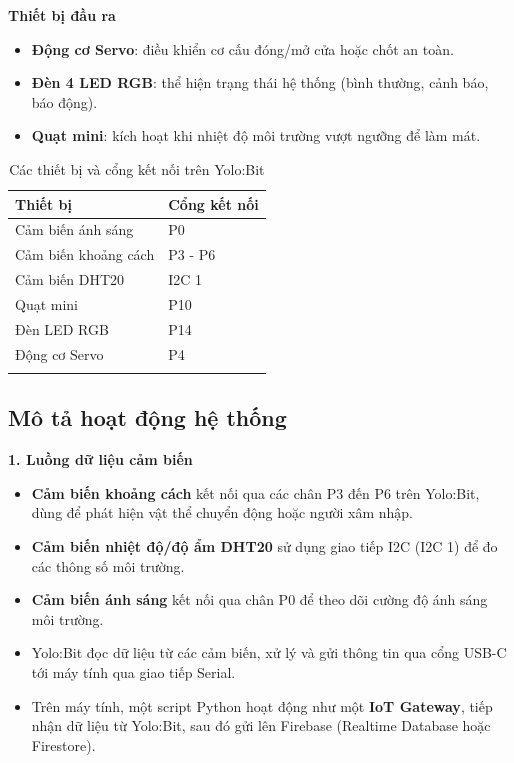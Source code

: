 \textbf{Thiết bị đầu ra}
\begin{itemize}
    \item \textbf{Động cơ Servo}: điều khiển cơ cấu đóng/mở cửa hoặc chốt an toàn.
    \item \textbf{Đèn 4 LED RGB}: thể hiện trạng thái hệ thống (bình thường, cảnh báo, báo động).
    \item \textbf{Quạt mini}: kích hoạt khi nhiệt độ môi trường vượt ngưỡng để làm mát.
\end{itemize}

\begin{longtable}{|p{5cm}|p{4cm}|}
    \hline
    \textbf{Thiết bị}    & \textbf{Cổng kết nối} \\
    \hline
    Cảm biến ánh sáng    & P0                    \\
    \hline
    Cảm biến khoảng cách & P3 - P6               \\
    \hline
    Cảm biến DHT20       & I2C 1                 \\
    \hline
    Quạt mini            & P10                   \\
    \hline
    Đèn LED RGB          & P14                   \\
    \hline
    Động cơ Servo        & P4                    \\
    \hline
    \caption{Các thiết bị và cổng kết nối trên Yolo:Bit}
    \label{tab:devices}
\end{longtable}

\subsection{Mô tả hoạt động hệ thống}

\textbf{1. Luồng dữ liệu cảm biến}

\begin{itemize}
    \item \textbf{Cảm biến khoảng cách} kết nối qua các chân P3 đến P6 trên Yolo:Bit, dùng để phát hiện vật thể chuyển động hoặc người xâm nhập.
    \item \textbf{Cảm biến nhiệt độ/độ ẩm DHT20} sử dụng giao tiếp I2C (I2C 1) để đo các thông số môi trường.
    \item \textbf{Cảm biến ánh sáng} kết nối qua chân P0 để theo dõi cường độ ánh sáng môi trường.
    \item Yolo:Bit đọc dữ liệu từ các cảm biến, xử lý và gửi thông tin qua cổng USB-C tới máy tính qua giao tiếp Serial.
    \item Trên máy tính, một script Python hoạt động như một \textbf{IoT Gateway}, tiếp nhận dữ liệu từ Yolo:Bit, sau đó gửi lên Firebase (Realtime Database hoặc Firestore).
\end{itemize}

